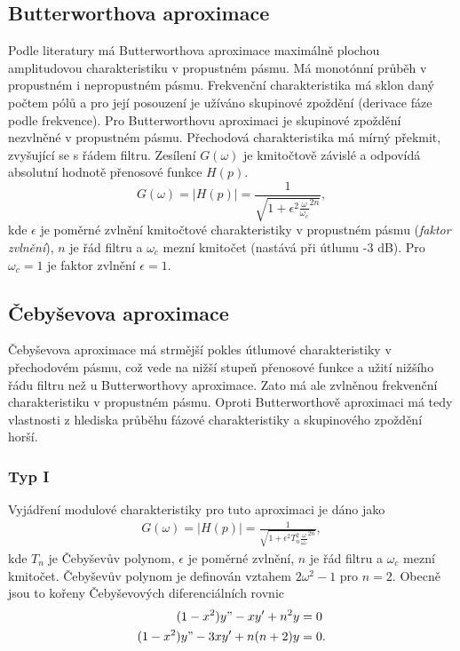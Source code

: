\subsection{Butterworthova aproximace}
Podle literatury \cite{7} má Butterworthova aproximace maximálně plochou amplitudovou charakteristiku v propustném pásmu. Má monotónní průběh v propustném i nepropustném pásmu. Frekvenční charakteristika má sklon daný počtem pólů a pro její posouzení je užíváno skupinové zpoždění (derivace fáze podle frekvence). Pro Butterworthovu aproximaci je skupinové zpoždění nezvlněné v propustném pásmu. Přechodová charakteristika má mírný překmit, zvyšující se s řádem filtru. Zesílení $G(\omega)$ je kmitočtově závislé a odpovídá absolutní hodnotě přenosové funkce $H(p)$.
\begin{equation}
G(\omega) = |H(p)| = \frac{1}{\sqrt{1 + \epsilon ^2 \frac{\omega}{\omega _c}^{2n}}},
\end{equation}
kde $\epsilon$ je poměrné zvlnění kmitočtové charakteristiky v propustném pásmu (\textit{faktor zvlnění}), $n$ je řád filtru a $\omega _c$ mezní kmitočet (nastává při útlumu -3 dB). Pro $\omega _c = 1$ je faktor zvlnění $\epsilon = 1$. 
\subsection{Čebyševova aproximace}
Čebyševova aproximace má strmější pokles útlumové charakteristiky v přechodovém pásmu, což vede na nižší stupeň přenosové funkce a užití nižšího řádu filtru než u Butterworthovy aproximace. Zato má ale zvlněnou frekvenční charakteristiku v propustném pásmu. Oproti Butterworthově aproximaci má tedy vlastnosti z hlediska průběhu fázové charakteristiky a skupinového zpoždění horší.
\subsubsection{Typ I}
Vyjádření modulové charakteristiky pro tuto aproximaci je dáno jako
\begin{align}
G(\omega) = |H(p)| = \frac{1}{\sqrt{1 + \epsilon ^2 T_n ^2 \frac{\omega}{\omega _c}^{2n}}},
\end{align}
kde $T_n$ je Čebyševův polynom, $\epsilon$ je poměrné zvlnění, $n$ je řád filtru a $\omega _c$ mezní kmitočet. Čebyševův polynom je definován vztahem $2 \omega ^2 - 1$ pro $n = 2$. Obecně jsou to kořeny Čebyševových diferenciálních rovnic
\begin{align}
(1 - x^2)y" - xy' + n^2y &= 0\\
(1 - x^2)y" - 3xy' + n(n+2)y &= 0.
\end{align}
